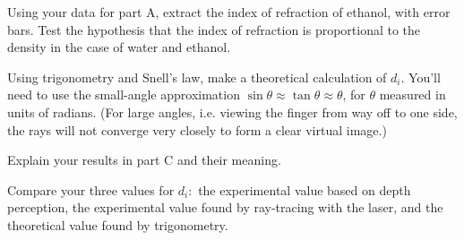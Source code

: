 \analysis

Using your data for part A, extract the index of refraction of ethanol, with error bars.
Test the hypothesis that the index of refraction is proportional to the density
in the case of water and ethanol.

Using trigonometry and Snell's law, make a theoretical
calculation of $d_i$. You'll need to use the small-angle
approximation $\sin  \theta \approx\tan \theta\approx\theta$, for $\theta $
measured in units of radians. (For large angles, i.e.
viewing the finger from way off to one side, the rays will
not converge very closely to form a clear virtual image.)

Explain your results in part C and their meaning.

Compare your three values for $d_i:$ the experimental value
based on depth perception, the experimental value found by
ray-tracing with the laser, and the theoretical value
found by trigonometry.
